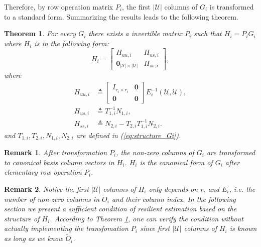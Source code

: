 \documentclass[journal]{IEEEtran}
\newcommand{\Uc}{{\mathcal{U}}}
\newcommand{\Sc}{{\mathcal{S}}}
\newcommand{\Oi}{{\tilde{O}_i}}
\newtheorem{theorem}{\textbf{Theorem}}
\newtheorem{remark}{\textbf{Remark}}
\begin{document}
	Therefore, by row operation matrix $P_i$, the first $|\Uc|$ columns of $G_i$ is transformed to a standard form. Summarizing the results leads to the following theorem.
	
	\begin{theorem}\label{th:Si_form}
		For every $G_i$ there exists a invertible matrix $P_i$ such that $H_i=P_i G_i$ where $H_i$ is in the following form:
		\begin{equation}
			H_i=\begin{bmatrix}
				H_{uu,i}	& 	H_{us,i} \\
				\mathbf{0}_{|\Sc|\times|\Uc|} & H_{ss,i}
			\end{bmatrix} ,
		\end{equation}
		where 
		\begin{align*}
			H_{uu,i} & \triangleq 	
			\begin{bmatrix}
				I_{r_i\times r_i} & \mathbf{0} \\
				\mathbf{0} & \mathbf{0} 
			\end{bmatrix}
			E_i^{-1}(\Uc,\Uc),\\
			H_{us,i}& \triangleq T^{-1}_{1,i} N_{1,i},
			\\
			H_{ss,i}& \triangleq N_{2,i}-T_{2,i} T^{-1}_{1,i} N_{2,i}.
		\end{align*}
		and $T_{1,i},T_{2,i},N_{1,i},N_{2,i}$ are defined in (\ref{eq:structure_Gi}).
	\end{theorem}
	
	\begin{remark}
		After transformation $P_i$, the non-zero columns of $G_i$ are transformed to canonical basis column vectors in $H_i$. 
		$H_i$ is the canonical form of $G_i$ after elementary row operation $P_i$. 
	\end{remark}
	\begin{remark}
		Notice the first $|\Uc|$ columns of $H_i$ only depends on $r_i$ and $E_i$, i.e. the number of non-zero columns in $\Oi$ and their column index.
		In the following section we present a sufficient condition of resilient estimation based on the structure of $H_i$. 
		According to Theorem \ref{th:Si_form}, one can verify the condition without actually implementing the transfomation $P_i$ since first $|\Uc|$ columns of $H_i$ is known as long as we know $\Oi$. 
	\end{remark}
	
\end{document}
